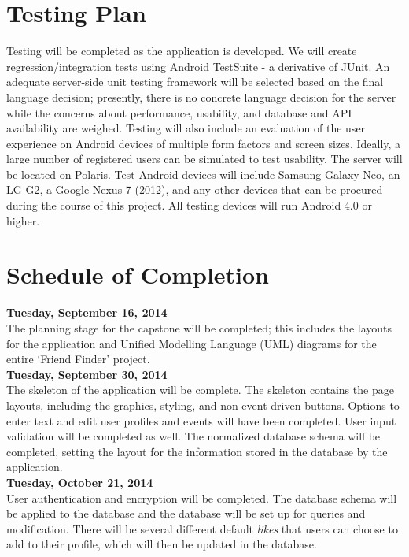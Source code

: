 \documentclass[11pt]{article}
\begin{document}
\section{Testing Plan}

    Testing will be completed as the application is developed. We will create 
    regression/integration tests using Android TestSuite - a derivative of 
    JUnit. An adequate server-side unit testing framework will be selected 
    based on the final language decision; presently, there is no concrete 
    language decision for the server while the concerns about 
    performance, usability, and database and API availability are weighed.  Testing will 
    also include an evaluation of the user experience on Android devices 
    of multiple form factors and screen sizes. Ideally, a large number of registered users 
    can be simulated to test usability. The server will be located on Polaris. 
    Test Android devices will include Samsung Galaxy Neo, an LG G2, 
    a Google Nexus 7 (2012), and any other devices that can be procured during 
    the course of this project. All testing devices will run Android 4.0 or higher. 

\section{Schedule of Completion}

\textbf{Tuesday, September 16, 2014}
\\
\indent  The planning stage for the capstone
will be completed; this includes the layouts for the application
and Unified Modelling Language (UML) diagrams for the entire `Friend Finder' project.\\


\textbf{Tuesday, September 30, 2014}
\\  \indent  The skeleton of the application 
    will be complete. The skeleton contains the page layouts, including the 
    graphics, styling, and non event-driven buttons. Options to 
    enter text and edit user profiles and events will have been completed. User input validation will 
    be completed as well. The normalized database schema will be 
    completed, setting the layout for the information stored in the database by
    the application. \\

\textbf{Tuesday, October 21, 2014}
\\	\indent User authentication and encryption will be completed. The 
    database schema will be applied to the database and the database will be set 
    up for queries and modification. There will be several different default \textit{likes} 
    that users can choose to add to their profile, which will then be updated 
    in the database.\\
\end{document}
